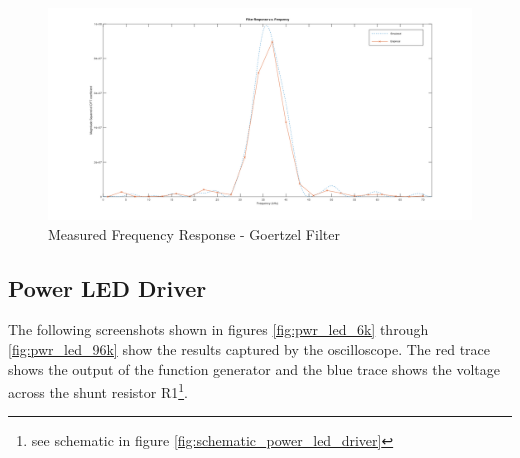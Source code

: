 \begin{figure}[H]
	\centering
	\includegraphics[width=\linewidth]{figures/results/goertzel_filter_empirical_wide.png}
	\caption{Measured Frequency Response - Goertzel Filter}
	\label{fig:goertzel_filter_response_empirical}
\end{figure}


\subsection{Power LED Driver}

The following screenshots shown in figures \ref{fig:pwr_led_6k} through \ref{fig:pwr_led_96k} show the results captured by the oscilloscope. The red trace shows the output of the function generator and the blue trace shows the voltage across the shunt resistor R1\footnote{see schematic in figure \ref{fig:schematic_power_led_driver}}.


